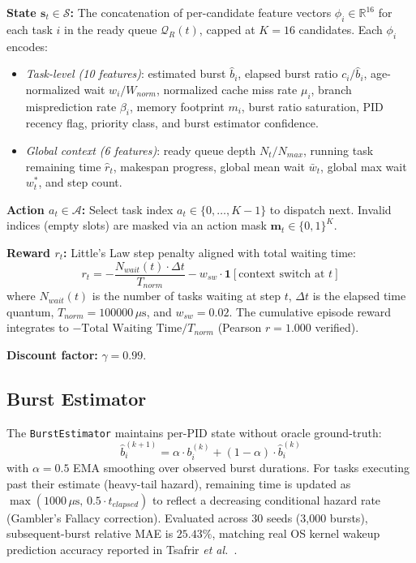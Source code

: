 \smallskip
\noindent\textbf{State $\mathbf{s}_t \in \mathcal{S}$:} The concatenation of per-candidate
feature vectors $\phi_i \in \mathbb{R}^{16}$ for each task $i$ in the ready
queue $\mathcal{Q}_R(t)$, capped at $K = 16$ candidates. Each $\phi_i$
encodes:
\begin{itemize}
  \item \textit{Task-level (10 features)}: estimated burst $\hat{b}_i$, elapsed
    burst ratio $c_i/\hat{b}_i$, age-normalized wait $w_i/W_{norm}$,
    normalized cache miss rate $\mu_i$, branch misprediction rate
    $\beta_i$, memory footprint $m_i$, burst ratio saturation, PID
    recency flag, priority class, and burst estimator confidence.
  \item \textit{Global context (6 features)}: ready queue depth $N_t/N_{max}$,
    running task remaining time $\hat{r}_t$, makespan progress, global mean
    wait $\bar{w}_t$, global max wait $w^*_t$, and step count.
\end{itemize}

\smallskip
\noindent\textbf{Action $a_t \in \mathcal{A}$:} Select task index $a_t \in \{0,\ldots,K-1\}$ to dispatch next. Invalid indices (empty slots) are
masked via an action mask $\mathbf{m}_t \in \{0,1\}^K$.

\smallskip
\noindent\textbf{Reward $r_t$:} Little's Law step penalty aligned with total waiting time:
\begin{equation}
  r_t = -\frac{N_{wait}(t) \cdot \Delta t}{T_{norm}} - w_{sw} \cdot
  \mathbf{1}[\text{context switch at } t]
  \label{eq:reward}
\end{equation}
where $N_{wait}(t)$ is the number of tasks waiting at step $t$,
$\Delta t$ is the elapsed time quantum, $T_{norm} = 100000\,\mu\text{s}$,
and $w_{sw} = 0.02$. The cumulative episode reward integrates to
$-\text{Total Waiting Time}/T_{norm}$ (Pearson $r = 1.000$ verified).

\smallskip
\noindent\textbf{Discount factor:} $\gamma = 0.99$.

\subsection{Burst Estimator}
\label{subsec:burst_est}

The \texttt{BurstEstimator} maintains per-PID state without oracle ground-truth:
\begin{equation}
  \hat{b}^{(k+1)}_i = \alpha \cdot b^{(k)}_i + (1-\alpha) \cdot \hat{b}^{(k)}_i
\end{equation}
with $\alpha = 0.5$ EMA smoothing over observed burst durations. For tasks
executing past their estimate (heavy-tail hazard), remaining time is updated as
$\max(1000\,\mu\text{s},\, 0.5 \cdot t_{elapsed})$ to reflect a
decreasing conditional hazard rate (Gambler's Fallacy correction). Evaluated
across 30 seeds (3{,}000 bursts), subsequent-burst relative MAE is $25.43\%$,
matching real OS kernel wakeup prediction accuracy reported in
Tsafrir \textit{et al.}~\cite{Tsafrir2007}.

